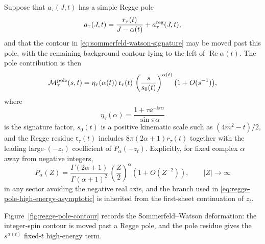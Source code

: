Suppose that \(a_\tau(J,t)\) has a simple Regge pole
\begin{equation}
  a_\tau(J,t)
  =
  \frac{r_\tau(t)}{J-\alpha(t)}
  +a_\tau^{\rm reg}(J,t),
  \label{eq:regge-pole-partial-wave}
\end{equation}
and that the contour in \eqref{eq:sommerfeld-watson-signature} may be moved
past this pole, with the remaining background contour lying to the left of
\(\operatorname{Re}\alpha(t)\).  The pole contribution is then
\begin{equation}
  \mathcal M_\tau^{\rm pole}(s,t)
  =
  \eta_\tau(\alpha(t))\,\mathfrak r_\tau(t)\,
  \left(\frac{s}{s_0(t)}\right)^{\alpha(t)}
  \bigl(1+O(s^{-1})\bigr),
  \label{eq:regge-pole-high-energy-asymptotic}
\end{equation}
where
\[
  \eta_\tau(\alpha)
  =
  \frac{1+\tau\ee^{-\ii\pi\alpha}}{\sin\pi\alpha}
\]
is the signature factor, \(s_0(t)\) is a positive kinematic scale such as
\((4m^2-t)/2\), and the Regge residue
\(\mathfrak r_\tau(t)\) includes \(8\pi(2\alpha+1)r_\tau(t)\) together with
the leading large-\((-z_t)\) coefficient of \(P_\alpha(-z_t)\).  Explicitly,
for fixed complex \(\alpha\) away from negative integers,
\[
  P_\alpha(Z)
  =
  \frac{\Gamma(2\alpha+1)}{\Gamma(\alpha+1)^2}\,
  \left(\frac{Z}{2}\right)^\alpha
  \left(1+O(Z^{-2})\right),
  \qquad |Z|\to\infty
\]
in any sector avoiding the negative real axis, and the branch used in
\eqref{eq:regge-pole-high-energy-asymptotic} is inherited from the
first-sheet continuation of \(z_t\).

Figure~\ref{fig:regge-pole-contour} records the Sommerfeld--Watson deformation:
the integer-spin contour is moved past a Regge pole, and the pole residue gives
the \(s^{\alpha(t)}\) fixed-\(t\) high-energy term.

